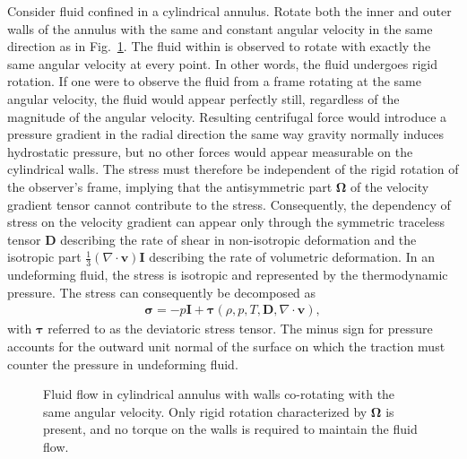 Consider fluid confined in a cylindrical annulus. Rotate both the inner and outer walls of the annulus with the same and constant angular velocity in the same direction as in Fig.~\ref{fig:cylinder-flow-rotation}. The fluid within is observed to rotate with exactly the same angular velocity at every point. In other words, the fluid undergoes rigid rotation. If one were to observe the fluid from a frame rotating at the same angular velocity, the fluid would appear perfectly still, regardless of the magnitude of the angular velocity. Resulting centrifugal force would introduce a pressure gradient in the radial direction the same way gravity normally induces hydrostatic pressure, but no other forces would appear measurable on the cylindrical walls. The stress must therefore be independent of the rigid rotation of the observer's frame, implying that the antisymmetric part $\bm{\Omega}$ of the velocity gradient tensor cannot contribute to the stress. Consequently, the dependency of stress on the velocity gradient can appear only through the symmetric traceless tensor $\bm{D}$ describing the rate of shear in non-isotropic deformation and the isotropic part $\tfrac{1}{3}(\nabla\cdot\bm{v})\bm{I}$ describing the rate of volumetric deformation. In an undeforming fluid, the stress is isotropic and represented by the thermodynamic pressure. The stress can consequently be decomposed as
\begin{align}\label{eq:stress}
    \bm{\sigma} = -p\bm{I} + \bm{\tau}(\rho, p, T, \bm{D}, \nabla\cdot\bm{v}),
\end{align}
with $\bm{\tau}$ referred to as the deviatoric stress tensor. The minus sign for pressure accounts for the outward unit normal of the surface on which the traction must counter the pressure in undeforming fluid.
\begin{figure}[!htb]
    \centering
    
    \caption{Fluid flow in cylindrical annulus with walls co-rotating with the same angular velocity. Only rigid rotation characterized by $\bm{\Omega}$ is present, and no torque on the walls is required to maintain the fluid flow.}
    \label{fig:cylinder-flow-rotation}
\end{figure}

